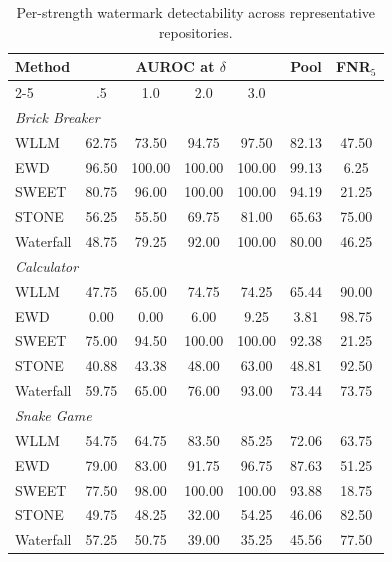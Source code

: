 \begin{table}[!t]
\centering
\begin{threeparttable}
\caption{Per-strength watermark detectability across representative repositories.}
\label{tab:per-strength-auroc}
\scriptsize
\setlength{\tabcolsep}{1.7pt}
\renewcommand{\arraystretch}{1.05}

\begin{tabular*}{\columnwidth}{@{\extracolsep{\fill}}lcccccc@{}}
\toprule
\textbf{Method}
& \multicolumn{4}{c}{\textbf{AUROC at $\delta$}}
& \textbf{Pool}
& \textbf{FNR$_5$} \\
\cmidrule(lr){2-5}
& .5 & 1.0 & 2.0 & 3.0 & & \\
\midrule

\multicolumn{7}{l}{\textit{Brick Breaker}}\\[-1pt]
WLLM      & 62.75 & 73.50 & 94.75 & 97.50 & 82.13 & 47.50 \\
EWD       & 96.50 & 100.00 & 100.00 & 100.00 & 99.13 &  6.25 \\
SWEET     & 80.75 & 96.00 & 100.00 & 100.00 & 94.19 & 21.25 \\
STONE     & 56.25 & 55.50 & 69.75 & 81.00 & 65.63 & 75.00 \\
Waterfall & 48.75 & 79.25 & 92.00 & 100.00 & 80.00 & 46.25 \\
\midrule

\multicolumn{7}{l}{\textit{Calculator}}\\[-1pt]
WLLM      & 47.75 & 65.00 & 74.75 & 74.25 & 65.44 & 90.00 \\
EWD       &  0.00 &  0.00 &  6.00 &  9.25 &  3.81 & 98.75 \\
SWEET     & 75.00 & 94.50 & 100.00 & 100.00 & 92.38 & 21.25 \\
STONE     & 40.88 & 43.38 & 48.00 & 63.00 & 48.81 & 92.50 \\
Waterfall & 59.75 & 65.00 & 76.00 & 93.00 & 73.44 & 73.75 \\
\midrule

\multicolumn{7}{l}{\textit{Snake Game}}\\[-1pt]
WLLM      & 54.75 & 64.75 & 83.50 & 85.25 & 72.06 & 63.75 \\
EWD       & 79.00 & 83.00 & 91.75 & 96.75 & 87.63 & 51.25 \\
SWEET     & 77.50 & 98.00 & 100.00 & 100.00 & 93.88 & 18.75 \\
STONE     & 49.75 & 48.25 & 32.00 & 54.25 & 46.06 & 82.50 \\
Waterfall & 57.25 & 50.75 & 39.00 & 35.25 & 45.56 & 77.50 \\
\midrule


\end{tabular*}
\end{threeparttable}
\end{table}
